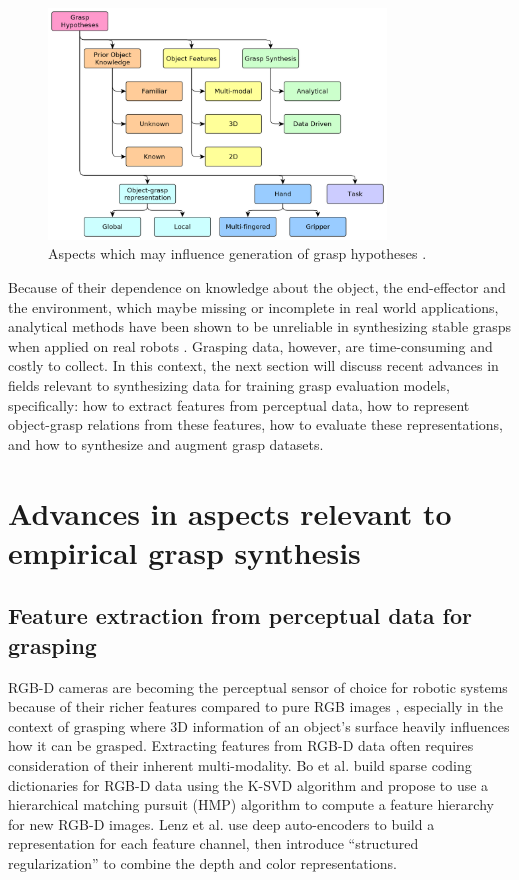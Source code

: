 \documentclass[runningheads]{../llncs}
\begin{document}
\begin{figure}[h!]
    \centering
    \includegraphics[width=0.8\textwidth]{bohg14-grasp_synthesis_mind_map}
    \caption{Aspects which may influence generation of grasp hypotheses \cite{Bohg2014}.}
    \label{fig:grasp_synthesis_mind_map}
\end{figure}

Because of their dependence on knowledge about the object, the end-effector and the environment, which maybe missing
or incomplete in real world applications, analytical methods have been shown to be unreliable in synthesizing stable
grasps when applied on real robots \cite{Kappler2015,Rubert2017,WeiszAllen2012}. Grasping data, however, are
time-consuming and costly to collect. In this context, the next section will discuss recent advances in fields relevant
to synthesizing data for training grasp evaluation models, specifically: how to extract features from perceptual data,
how to represent object-grasp relations from these features, how to evaluate these representations, and how to
synthesize and augment grasp datasets.

\section{Advances in aspects relevant to empirical grasp synthesis} \label{sec:soa}

\subsection{Feature extraction from perceptual data for grasping}

RGB-D cameras are becoming the perceptual sensor of choice for robotic systems because of their richer features
compared to pure RGB images \cite{lenz2015,Eitel2015,Gupta2014RGBDFeatures,jiang2011}, especially in the context of
grasping where 3D information of an object's surface heavily influences how it can be grasped. Extracting features from
RGB-D data often requires consideration of their inherent multi-modality. Bo et al. \cite{Bo2013} build sparse coding
dictionaries for RGB-D data using the K-SVD algorithm and propose to use a hierarchical matching pursuit (HMP)
algorithm to compute a feature hierarchy for new RGB-D images. Lenz et al. \cite{lenz2015} use deep auto-encoders to
build a representation for each feature channel, then introduce ``structured regularization'' to combine the depth and
color representations.
\end{document}

